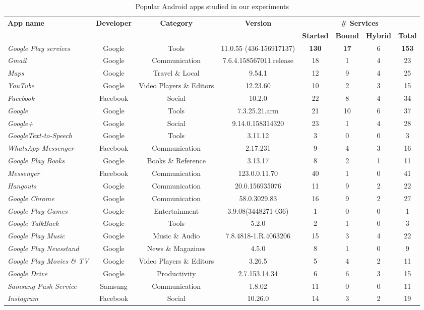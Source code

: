 \documentclass[sigconf,review, anonymous]{acmart}
\begin{document}
\begin{table} 
\centering
\small
\caption{Popular Android apps studied in our experiments}
\begin{tabular}{|l|c|c|c|cccc|}\hline
{\bf App name}&{\bf Developer}&{\bf Category}&{\bf Version}&\multicolumn{4}{|c|}{\textbf{\#  Services}}\\
&  & & &{\bf Started}&{\bf Bound}&{\bf Hybrid} &{\bf Total}\\\hline
\hline
{\it Google Play services}&Google&Tools&11.0.55 (436-156917137)&{\bf 130}&{\bf 17}&6&{\bf 153}\\
{\it Gmail}&Google&Communication&7.6.4.158567011.release&18&1&4&23\\
{\it Maps}&Google&Travel \& Local&9.54.1&12&9&4&25\\
{\it YouTube}&Google&Video Players \& Editors&12.23.60&10&2&3&15\\
{\it Facebook}&Facebook&Social&10.2.0&22&8&4&34\\
{\it Google}&Google&Tools&7.3.25.21.arm&21&10&6&37\\
{\it Google+}&Google&Social&9.14.0.158314320&23&1&4&28\\
{\it GoogleText-to-Speech}&Google&Tools&3.11.12&3&0&0&3\\
{\it WhatsApp Messenger}&Facebook&Communication&2.17.231&9&4&3&16\\
{\it Google Play Books}&Google&Books \& Reference&3.13.17&8&2&1&11\\
{\it Messenger}&Facebook&Communication&123.0.0.11.70&40&1&0&41\\
{\it Hangouts}&Google&Communication&20.0.156935076&11&9&2&22\\
{\it Google Chrome}&Google&Communication&58.0.3029.83&16&9&2&27\\
{\it Google Play Games}&Google&Entertainment&3.9.08(3448271-036)&1&0&0&1\\
{\it Google TalkBack}&Google&Tools&5.2.0&2&1&0&3\\
{\it Google Play Music}&Google&Music \& Audio&7.8.4818-1.R.4063206&15&3&4&22\\
{\it Google Play Newsstand}&Google&News \& Magazines&4.5.0&8&1&0&9\\
{\it Google Play Movies \& TV}&Google&Video Players \& Editors&3.26.5&5&4&2&11\\
{\it Google Drive}&Google&Productivity&2.7.153.14.34&6&6&3&15\\
{\it Samsung Push Service}&Samsung&Communication&1.8.02&11&0&0&11\\
{\it Instagram}&Facebook&Social&10.26.0&14&3&2&19\\

\end{tabular}
\end{table}
\end{document}
